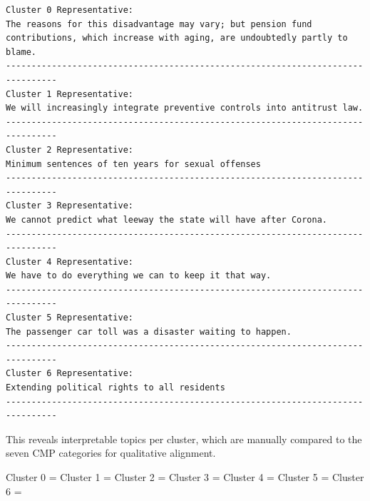 \documentclass[
  letterpaper,
  DIV=11,
  numbers=noendperiod]{scrartcl}
\begin{document}
\begin{verbatim}
Cluster 0 Representative:
The reasons for this disadvantage may vary; but pension fund contributions, which increase with aging, are undoubtedly partly to blame.
--------------------------------------------------------------------------------
Cluster 1 Representative:
We will increasingly integrate preventive controls into antitrust law.
--------------------------------------------------------------------------------
Cluster 2 Representative:
Minimum sentences of ten years for sexual offenses
--------------------------------------------------------------------------------
Cluster 3 Representative:
We cannot predict what leeway the state will have after Corona.
--------------------------------------------------------------------------------
Cluster 4 Representative:
We have to do everything we can to keep it that way.
--------------------------------------------------------------------------------
Cluster 5 Representative:
The passenger car toll was a disaster waiting to happen.
--------------------------------------------------------------------------------
Cluster 6 Representative:
Extending political rights to all residents
--------------------------------------------------------------------------------
\end{verbatim}

This reveals interpretable topics per cluster, which are manually
compared to the seven CMP categories for qualitative alignment.

Cluster 0 = Cluster 1 = Cluster 2 = Cluster 3 = Cluster 4 = Cluster 5 =
Cluster 6 =


\printbibliography
\end{document}
